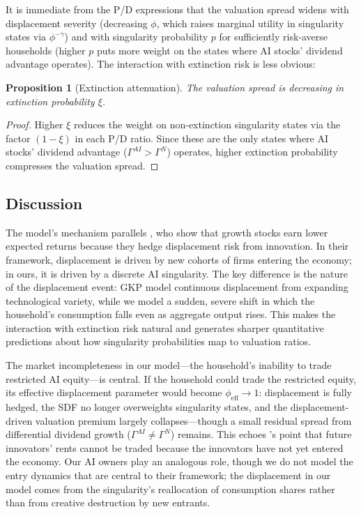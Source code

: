 \documentclass[12pt]{article}
\newtheorem{proposition}{Proposition}
\begin{document}
It is immediate from the P/D expressions that the valuation spread widens with displacement severity (decreasing $\phi$, which raises marginal utility in singularity states via $\phi^{-\gamma}$) and with singularity probability $p$ for sufficiently risk-averse households (higher $p$ puts more weight on the states where AI stocks' dividend advantage operates). The interaction with extinction risk is less obvious:

\begin{proposition}[Extinction attenuation] \label{prop:comp-statics} %
The valuation spread is decreasing in extinction probability $\xi$.
\end{proposition}

\begin{proof}
Higher $\xi$ reduces the weight on non-extinction singularity states via the factor $(1-\xi)$ in each P/D ratio. Since these are the only states where AI stocks' dividend advantage ($\Gamma^{AI} > \Gamma^{N}$) operates, higher extinction probability compresses the valuation spread.
\end{proof}

\subsection{Discussion} %

The model's mechanism parallels \citet{GKP2012}, who show that growth stocks earn lower expected returns because they hedge displacement risk from innovation. In their framework, displacement is driven by new cohorts of firms entering the economy; in ours, it is driven by a discrete AI singularity. The key difference is the nature of the displacement event: GKP model continuous displacement from expanding technological variety, while we model a sudden, severe shift in which the household's consumption falls even as aggregate output rises. This makes the interaction with extinction risk \citep{Jones2024} natural and generates sharper quantitative predictions about how singularity probabilities map to valuation ratios.

The market incompleteness in our model---the household's inability to trade restricted AI equity---is central. If the household could trade the restricted equity, its effective displacement parameter would become $\phi_\text{eff} \to 1$: displacement is fully hedged, the SDF no longer overweights singularity states, and the displacement-driven valuation premium largely collapses---though a small residual spread from differential dividend growth ($\Gamma^{AI} \neq \Gamma^{N}$) remains. This echoes \citet{GKP2012}'s point that future innovators' rents cannot be traded because the innovators have not yet entered the economy. Our AI owners play an analogous role, though we do not model the entry dynamics that are central to their framework; the displacement in our model comes from the singularity's reallocation of consumption shares rather than from creative destruction by new entrants.
\end{document}
